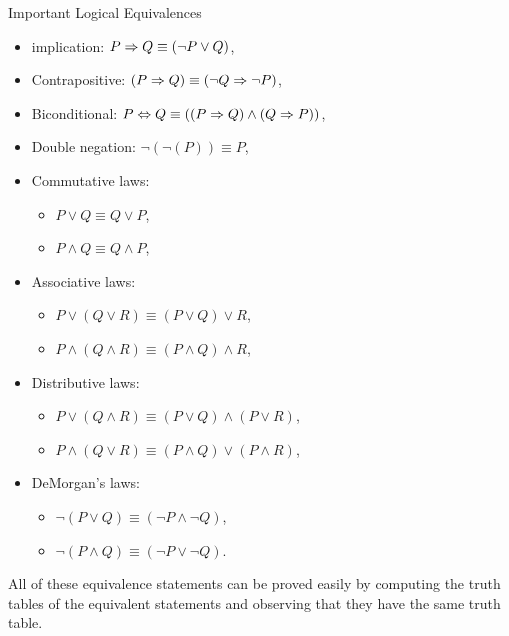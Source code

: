 \begin{thmbox}{Important Logical Equivalences}
	\begin{itemize}
		\item implication: $ P \Rightarrow Q  \equiv ( \neg P \vee Q)$,
		\item Contrapositive: $ (P \Rightarrow Q) \equiv (\neg Q \Rightarrow \neg P) $,
		\item Biconditional: $ P \Leftrightarrow Q \equiv ((P \Rightarrow Q) \wedge (Q \Rightarrow P)) $,
		\item Double negation: $ \neg (\neg (P))  \equiv P $,
		\item Commutative laws: \begin{itemize}
			\item $ P \vee Q \equiv Q \vee P $,
			\item $ P \wedge Q \equiv Q \wedge P $,
		\end{itemize}
		\item Associative laws: \begin{itemize}
			\item $ P \vee (Q \vee R) \equiv (P \vee Q) \vee R $,
			\item $ P \wedge (Q \wedge R) \equiv (P \wedge Q) \wedge R $,
		\end{itemize}
		\item Distributive laws: \begin{itemize}
			\item $ P \vee (Q \wedge R) \equiv (P \vee Q) \wedge (P \vee R) $,
			\item $ P \wedge (Q \vee R) \equiv (P \wedge Q) \vee (P \wedge R) $,
		\end{itemize}
		\item DeMorgan's laws: \begin{itemize}
			\item $ \neg (P \vee Q) \equiv (\neg P \wedge \neg Q) $,
			\item $ \neg (P \wedge Q) \equiv (\neg P \vee \neg Q) $.
		\end{itemize}
	\end{itemize}
\end{thmbox}

 All of these equivalence statements can be proved easily by computing the truth tables of the equivalent statements and observing that they have the same truth table. 